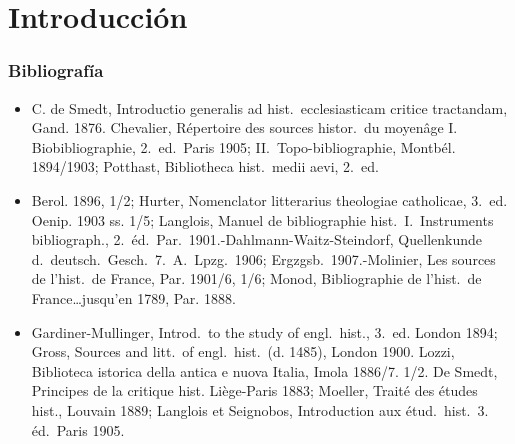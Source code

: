 \raggedbottom{} \documentclass[12pt, a4paper]{book}
\begin{document}
\chapter{Introducción}
\subsection{Bibliografía}
\begin{itemize}
  \item C. de Smedt, Introductio generalis ad hist.\ ecclesiasticam critice tractandam, Gand. 1876. Chevalier, Répertoire des sources histor.\ du moyenâge I. Biobibliographie, 2.\ ed.\ Paris 1905; II.\ Topo-bibliographie, Montbél. 1894/1903; Potthast, Bibliotheca hist.\ medii aevi, 2.\ ed.
  \item Berol. 1896, 1/2; Hurter, Nomenclator litterarius theologiae catholicae, 3.\ ed. Oenip. 1903 ss. 1/5; Langlois, Manuel de bibliographie hist.\ I.\ Instruments bibliograph., 2.\ éd.\ Par.\ 1901.-Dahlmann-Waitz-Steindorf, Quellenkunde d.\ deutsch.\ Gesch.\ 7.\ A.\ Lpzg.\ 1906; Ergzgsb.\ 1907.-Molinier, Les sources de l'hist.\ de France, Par. 1901/6, 1/6; Monod, Bibliographie de l'hist.\ de France\ldots jusqu'en 1789, Par. 1888.
  \item Gardiner-Mullinger, Introd.\ to the study of engl.\ hist., 3.\ ed. London 1894; Gross, Sources and litt.\ of engl.\ hist.\ (d. 1485), London 1900. Lozzi, Biblioteca istorica della antica e nuova Italia, Imola 1886/7. 1/2. De Smedt, Principes de la critique hist. Liège-Paris 1883; Moeller, Traité des études hist., Louvain 1889; Langlois et Seignobos, Introduction aux étud.\ hist.\ 3. éd.\ Paris 1905.
\end{itemize}
\end{document}
